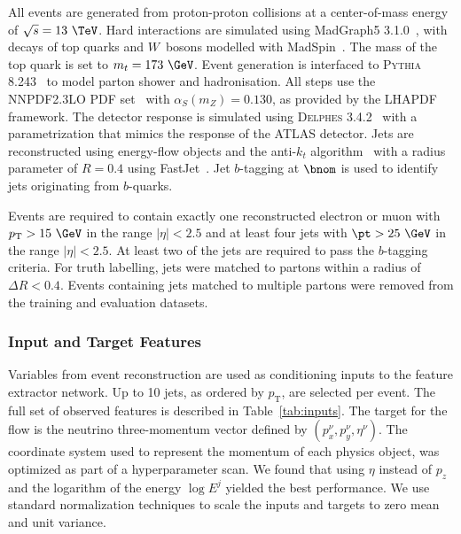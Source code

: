 All events are generated from proton-proton collisions at a center-of-mass energy of $\sqrt{s} = 13~\TeV$.
Hard interactions are simulated using MadGraph5 3.1.0~\cite{MadGraph}, with decays of top quarks and $W$~bosons modelled with MadSpin~\cite{MadSpin}.
The mass of the top quark is set to $m_t = 173~\GeV$.
Event generation is interfaced to \textsc{Pythia 8.243}~\cite{Pythia8} to model parton shower and hadronisation.
All steps use the \textsc{NNPDF2.3LO} PDF set~\cite{PDF2.3} with $\alpha_S(m_Z) = 0.130$, as provided by the LHAPDF~\cite{LHAPDF6PartonDensity} framework.
The detector response is simulated using \textsc{Delphes 3.4.2}~\cite{Delphes} with a parametrization that mimics the response of the ATLAS detector.
Jets are reconstructed using energy-flow objects and the anti-$k_t$ algorithm~\cite{AntiKt} with a radius parameter of $R = 0.4$ using FastJet~\cite{FastJet}.
Jet $b$-tagging at $\bnom$ is used to identify jets originating from $b$-quarks.

Events are required to contain exactly one reconstructed electron or muon with $p_\mathrm{T} > 15~\GeV$ in the range $|\eta|<2.5$ and at least four jets with $\pt > 25~\GeV$ in the range $|\eta|<2.5$.
At least two of the jets are required to pass the $b$-tagging criteria.
For truth labelling, jets were matched to partons within a radius of $\Delta R < 0.4$.
Events containing jets matched to multiple partons were removed from the training and evaluation datasets.

\subsubsection{Input and Target Features}

Variables from event reconstruction are used as conditioning inputs to the feature extractor network.
Up to 10 jets, as ordered by $p_\mathrm{T}$, are selected per event.
The full set of observed features is described in Table~\ref{tab:inputs}.
The target for the flow is the neutrino three-momentum vector defined by $(p_x^\nu, p_y^\nu, \eta^\nu )$.
The coordinate system used to represent the momentum of each physics object, was optimized as part of a hyperparameter scan.
We found that using $\eta$ instead of $p_z$ and the logarithm of the energy $\log E^j$ yielded the best performance.
We use standard normalization techniques to scale the inputs and targets to zero mean and unit variance.

